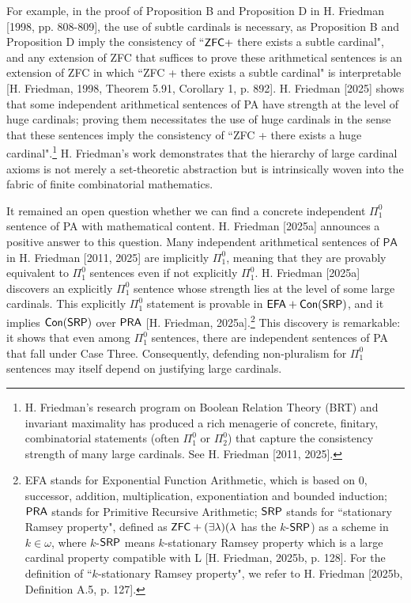 \documentclass[a4paper,12pt]{amsart}
\theoremstyle{definition}
\numberwithin{equation}{section}
\begin{document}
For example, in the proof of Proposition B and Proposition D in H. Friedman [1998, pp. 808-809], the use of subtle cardinals is necessary, as Proposition B and Proposition D imply the consistency of ``${\sf ZFC} +$ there exists a subtle cardinal", and any extension of {\sf ZFC} that suffices to prove these arithmetical sentences is an extension of {\sf ZFC} in which ``{\sf ZFC} + there exists a subtle cardinal" is interpretable [H. Friedman, 1998, Theorem 5.91, Corollary 1, p. 892].   H. Friedman [2025] shows that some independent arithmetical sentences of {\sf PA} have strength at the level of huge cardinals; proving them necessitates the use of huge cardinals in the sense that these sentences imply the consistency of ``{\sf ZFC} + there exists a huge cardinal".\footnote{H. Friedman's research program on Boolean Relation Theory (BRT) and invariant maximality has produced a rich menagerie of concrete, finitary, combinatorial statements (often $\Pi^0_1$ or $\Pi^0_2$) that capture the consistency strength of many large cardinals. See H. Friedman [2011, 2025].}  H. Friedman's work demonstrates that the hierarchy of large cardinal axioms is not merely a set-theoretic abstraction but is intrinsically woven into the fabric of finite combinatorial mathematics.

It remained an open question whether we can find a concrete independent $\Pi^0_1$ sentence of {\sf PA} with mathematical content. H. Friedman [2025a] announces a positive answer to this question. Many independent arithmetical sentences of $\mathsf{PA}$ in H. Friedman [2011, 2025] are implicitly $\Pi^0_1$, meaning that they are provably equivalent to $\Pi^0_1$ sentences even if not explicitly  $\Pi^0_1$. H. Friedman [2025a] discovers  an explicitly $\Pi^0_1$ sentence whose strength lies at the level of some large cardinals. This explicitly $\Pi^0_1$ statement is provable in $\sf EFA + \sf Con(SRP)$, and it implies $\sf Con(SRP)$ over $\sf PRA$ [H. Friedman, 2025a].\footnote{{\sf EFA} stands for Exponential Function Arithmetic, which is based on $0$, successor, addition, multiplication, exponentiation and bounded induction; $\sf PRA$ stands for Primitive Recursive Arithmetic; $\sf SRP$   stands for ``stationary Ramsey property", defined as  ${\sf ZFC} + (\exists\lambda)(\lambda$ has the $k$-$\sf SRP$) as a scheme in $k\in\omega$, where $k$-$\sf SRP$ means $k$-stationary Ramsey property which is a large cardinal property compatible with {\sf L} [H. Friedman, 2025b, p. 128]. For the definition of ``$k$-stationary Ramsey property", we refer to H. Friedman [2025b, Definition A.5, p. 127].}  This discovery is remarkable: it shows that even among $\Pi^0_1$ sentences, there are  independent sentences of {\sf PA} that fall under Case Three. Consequently, defending non-pluralism for $\Pi^0_1$ sentences may itself depend on justifying large cardinals.
                  
\end{document}
